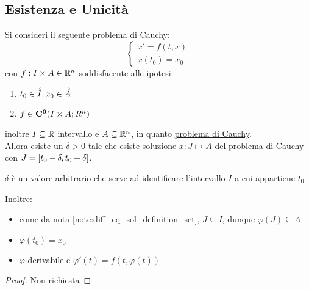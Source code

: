 \subsection{Esistenza e Unicità}
\begin{proposition}
	Si consideri il seguente problema di Cauchy:
	$$\left\{\begin{matrix} x'=f(t,x)\\x(t_0)=x_0\end{matrix}\right.$$
	con $f:I\times A\in \mathbb{R}^n$ soddisfacente alle ipotesi:
	\begin{enumerate}
		\item $t_0\in \accentset{\circ}{I}, x_0\in \accentset{\circ}{A}$
		\item $f\in \mathbf{C^{0}}(I\times A;R^n)$
	\end{enumerate}
	inoltre $I\subseteq \mathbb{R}$ intervallo e $A\subseteq \mathbb{R}^n$, in quanto \hyperref[def:prob_cauchy_ord_1]{problema di Cauchy}.\\
	Allora esiste un $\delta>0$ tale che esiste soluzione $x:J\mapsto A$ del problema di Cauchy con $J=\left[t_0-\delta,t_0+\delta\right]$.
	\begin{note}
		$\delta$ è un valore arbitrario che serve ad identificare l'intervallo $I$ a cui appartiene $t_0$
	\end{note}
	\noindent Inoltre:
	\begin{itemize}
		\item come da nota \ref{note:diff_eq_sol_definition_set}, $J\subseteq I$, dunque $\varphi(J)\subseteq A$
		\item $\varphi(t_0)=x_0$
		\item $\varphi$ derivabile e $\varphi'(t)=f(t,\varphi(t))$
	\end{itemize} 
	\begin{proof}
		Non richiesta
	\end{proof}
\end{proposition}
